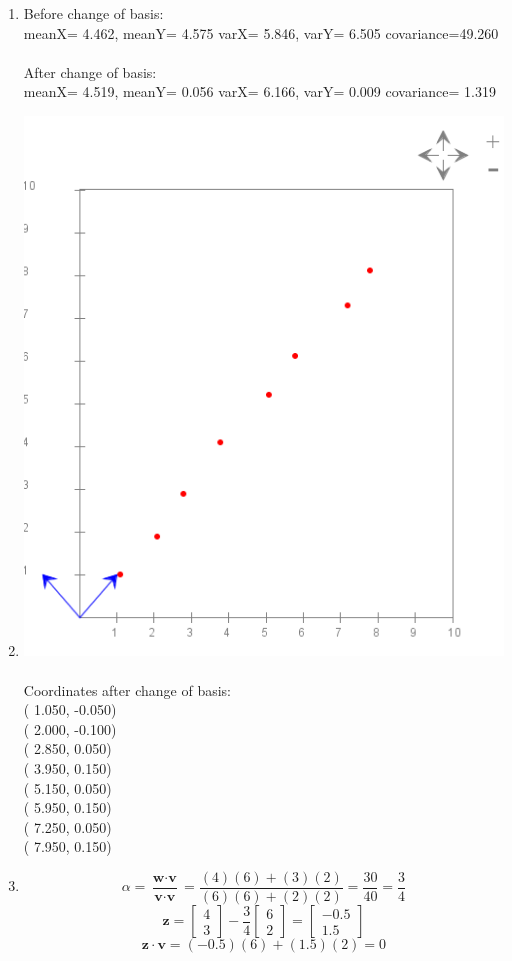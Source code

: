 \documentclass{article}
\begin{document}
\begin{enumerate}
\item Before change of basis:\\
	meanX= 4.462, meanY= 4.575 varX= 5.846, varY= 6.505 covariance=49.260
	\\\\
	After change of basis:\\
	meanX= 4.519, meanY= 0.056 varX= 6.166, varY= 0.009 covariance= 1.319

\item 
\includegraphics[scale=.5]{module7_exercise19}
	\\\\
	Coordinates after change of basis:\\
	( 1.050, -0.050)\\
	( 2.000, -0.100)\\
	( 2.850,  0.050)\\
	( 3.950,  0.150)\\
	( 5.150,  0.050)\\
	( 5.950,  0.150)\\
	( 7.250,  0.050)\\
	( 7.950,  0.150)

\item $$ \alpha = \frac{\textbf{w} \cdot \textbf{v}}{\textbf{v} \cdot \textbf{v}} = \frac{(4)(6) + (3)(2)}{(6)(6) + (2)(2)} = \frac{30}{40} = \frac{3}{4}$$
	$$ \textbf{z} = \begin{bmatrix}4 \\ 3\end{bmatrix} - \frac{3}{4}\begin{bmatrix}6 \\ 2\end{bmatrix} = \begin{bmatrix}-0.5 \\ 1.5\end{bmatrix}$$
	$$ \textbf{z} \cdot \textbf{v} = (-0.5)(6) + (1.5)(2) = 0$$



\end{enumerate}
\end{document}

